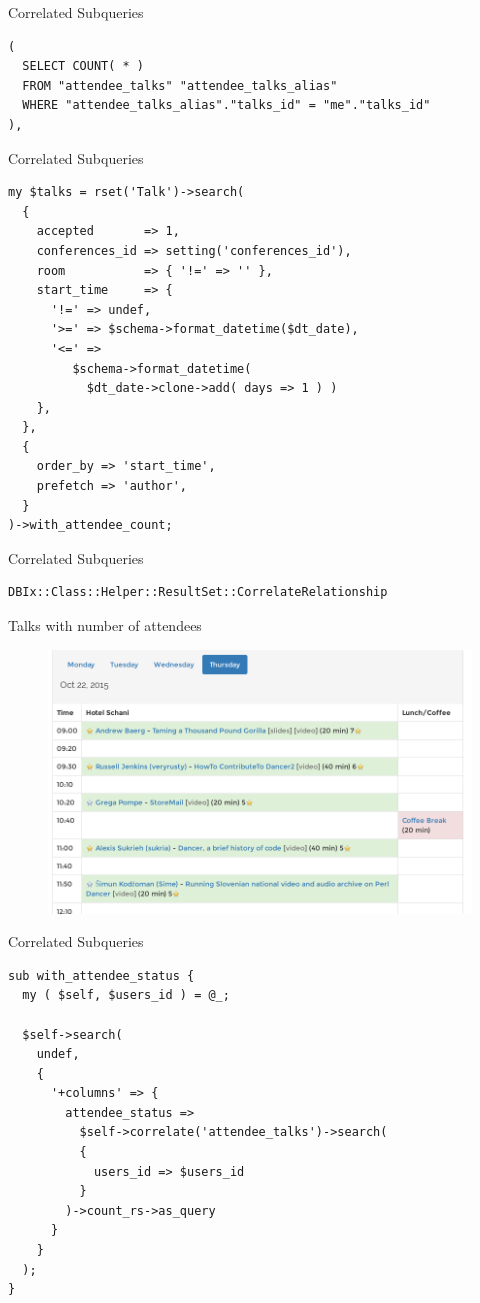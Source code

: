 \begin{frame}[fragile]{Correlated Subqueries}
\begin{lstlisting}
( 
  SELECT COUNT( * ) 
  FROM "attendee_talks" "attendee_talks_alias" 
  WHERE "attendee_talks_alias"."talks_id" = "me"."talks_id"
), 
\end{lstlisting}
\end{frame}

\begin{frame}[fragile]{Correlated Subqueries}
\begin{lstlisting}
my $talks = rset('Talk')->search(
  {
    accepted       => 1,
    conferences_id => setting('conferences_id'),
    room           => { '!=' => '' },
    start_time     => {
      '!=' => undef,
      '>=' => $schema->format_datetime($dt_date),
      '<=' =>
         $schema->format_datetime( 
           $dt_date->clone->add( days => 1 ) )
    },
  },
  {
    order_by => 'start_time',
    prefetch => 'author',
  }
)->with_attendee_count;
\end{lstlisting}
\end{frame}

\begin{frame}[fragile]{Correlated Subqueries}
\begin{lstlisting}
DBIx::Class::Helper::ResultSet::CorrelateRelationship
\end{lstlisting}
\end{frame}

\begin{frame}{Talks with number of attendees}
\begin{figure}[!ht]
\centering
\includegraphics[width=0.8\linewidth]{img/schedule2015.png}
\end{figure}
\end{frame}

\begin{frame}[fragile]{Correlated Subqueries}
\begin{lstlisting}
sub with_attendee_status {
  my ( $self, $users_id ) = @_;

  $self->search(
    undef,
    {
      '+columns' => {
        attendee_status => 
          $self->correlate('attendee_talks')->search(
          {
            users_id => $users_id
          }
        )->count_rs->as_query
      }
    }
  );
}
\end{lstlisting}
\end{frame}

